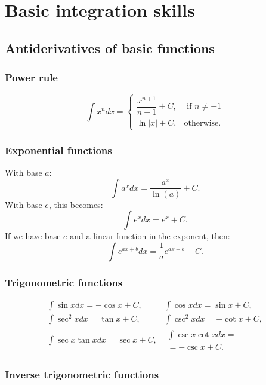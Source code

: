 \section{Basic integration skills}
\subsection*{Antiderivatives of basic functions}

\subsubsection*{Power rule}
\[
    \int x^n dx = \left\{
            \begin{array}{ll}
                \dfrac{x^{n+1}}{n+1} + C, & \text{ if } n \neq -1 \\[0.5cm]
                \ln |x| + C, & \text{otherwise}.
            \end{array}
        \right.  
\]
\subsubsection*{Exponential functions}
\par
With base $a$:
\[
     \int a^x dx = \dfrac{a^x}{\ln(a)} + C.       
\]
With base $e$, this becomes:
\[
    \int e^x dx = e^x + C.
\]
If we have base $e$ and a linear function in the exponent, then:
\[
    \int e^{ax+b} dx = \dfrac{1}{a} e^{ax+b} + C.
\]

\subsubsection*{Trigonometric functions}

\[
    \begin{array}{ll}
        \int \sin x dx = -\cos x + C, & \int \cos x dx = \sin x + C,\\[0.5cm]
        \int \sec^2 x dx = \tan x + C, & \int \csc^2 x dx = -\cot x + C, \\[0.5cm]
        \int \sec x \tan x dx = \sec x + C, & \begin{array}{c} \int \csc x \cot x dx = \\ = - \csc x + C.
        \end{array}
    \end{array}
\]

\subsubsection*{Inverse trigonometric functions}

